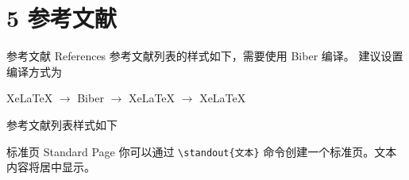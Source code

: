 \documentclass[10pt,aspectratio=169,fontset=none]{ctexbeamer}
\begin{document}
    \section{5 参考文献}

    \begin{frame}{参考文献 References}
        参考文献列表的样式如下，需要使用 Biber 编译。 建议设置编译方式为 
        \begin{center}
            XeLaTeX $\to$ Biber $\to$ XeLaTeX $\to$ XeLaTeX
        \end{center}
        参考文献列表样式如下
         
        
    \end{frame}

    \begin{frame}{标准页 Standard Page}
        你可以通过 \texttt{\textcolor{primary}{\textbackslash standout}\{文本\}} 命令创建一个标准页。文本内容将居中显示。
    \end{frame}

\end{document}
